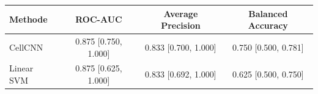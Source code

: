 \begin{tabular*}{\linewidth}{@{\extracolsep{\fill}}lccc@{}}
\toprule
Methode & ROC-AUC & Average Precision & Balanced Accuracy \\
\midrule
\textcolor{cellcnn}{CellCNN} & 0.875 [0.750, 1.000] & 0.833 [0.700, 1.000] & 0.750 [0.500, 0.781] \\
\textcolor{svm}{Linear SVM} & 0.875 [0.625, 1.000] & 0.833 [0.692, 1.000] & 0.625 [0.500, 0.750] \\
\bottomrule
\end{tabular*}
